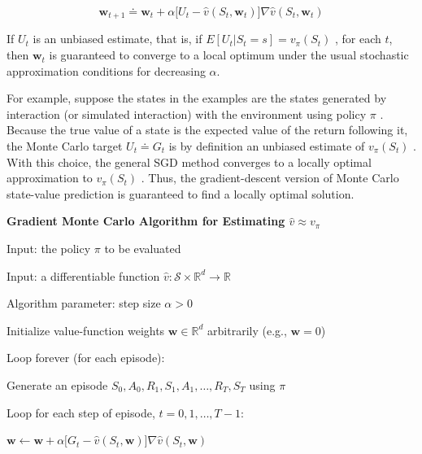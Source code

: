 \documentclass{article}
\begin{document}
$$
\mathbf { w } _ { t + 1 } \doteq \mathbf { w } _ { t } + \alpha \Big [ U _ { t } - \hat { v } ( S _ { t } \mathbf { , } \mathbf { w } _ { t } ) \Big ] \nabla \hat { v } ( S _ { t } \mathbf { , } \mathbf { w } _ { t } )
$$

If $U _ { t }$ is an unbiased estimate, that is, if $E [ U _ { t } | S _ { t }   =   s ]   =   v _ { \pi } ( S _ { t } )$ , for each $t$, then $\mathbf { w } _ { t }$ is guaranteed to converge to a local optimum under the usual stochastic approximation conditions for decreasing $\alpha$.

For example, suppose the states in the examples are the states generated by interaction (or simulated interaction) with the environment using policy $\pi$ . Because the true value of a state is the expected value of the return following it, the Monte Carlo target $U _ { t } \doteq G _ { t }$ is by definition 
an unbiased estimate of $v _ { \pi } ( S _ { t } )$ . With this choice, the general SGD method converges to a locally optimal approximation to $v _ { \pi } ( S _ { t } )$ . Thus, the gradient-descent version of Monte Carlo state-value prediction is guaranteed to find a locally optimal solution.

\textbf{Gradient Monte Carlo Algorithm for Estimating $\hat { v } \approx v _ { \pi }$}

Input: the policy $\pi$ to be evaluated

Input: a differentiable function $\hat { v } : \mathcal { S } \times \mathbb { R } ^ { d } \rightarrow \mathbb { R }$

Algorithm parameter: step size $\alpha > 0$

Initialize value-function weights $\mathbf { w } \in \mathbb { R } ^ { d }$ arbitrarily (e.g., $\mathbf{w} = 0$)

Loop forever (for each episode):

\hspace{.5cm} Generate an episode $S _ { 0 } , A _ { 0 } , R _ { 1 } , S _ { 1 } , A _ { 1 } , \ldots , R _ { T } , S _ { T }$ using $\pi$

\hspace{.5cm} Loop for each step of episode, $t = 0 , 1 , \ldots , T - 1$:

\hspace{1cm} $\mathbf { w } \leftarrow \mathbf { w } + \alpha \big [ G _ { t } - \hat { v } ( S _ { t } \mathbf { , } \mathbf { w } ) \big ] \nabla \hat { v } ( S _ { t } \mathbf { , } \mathbf { w } )$
\end{document}
